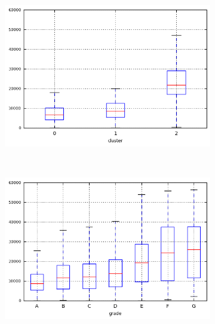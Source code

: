 \begin{anexosenv}
\begin{figure}[t!]
\begin{subfigure}[t]{0.45\textwidth}
            \centerline{\includegraphics[width=1\textwidth]{img/total_pymnt_inv_by_cluster}}
        \end{subfigure}%
        ~ 
        \begin{subfigure}[t]{0.45\textwidth}
            \centering
   
            \centerline{\includegraphics[width=1\textwidth]{img/total_pymnt_inv_by_grade}}

        \end{subfigure}
        \\
                \caption{\emph{Boxplots} de last\textunderscore pymnt\textunderscore amnt}
        \begin{subfigure}[t]{0.45\textwidth}
            \centering


\end{subfigure}
\end{figure}
\end{anexosenv}
